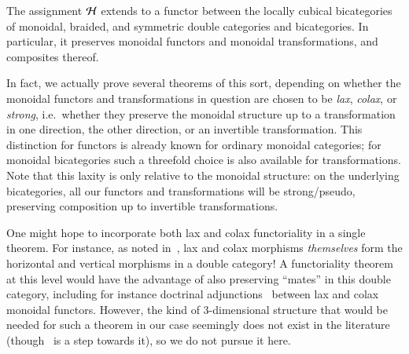\begin{thm}\label{thm:functor-intro}
  The assignment $\mathcal{H}$ extends to a functor between the locally cubical bicategories of monoidal, braided, and symmetric double categories and bicategories.
  In particular, it preserves monoidal functors and monoidal transformations, and composites thereof.
\end{thm}

In fact, we actually prove several theorems of this sort, depending on whether the monoidal functors and transformations in question are chosen to be \emph{lax}, \emph{colax}, or \emph{strong}, i.e.\ whether they preserve the monoidal structure up to a transformation in one direction, the other direction, or an invertible transformation.
This distinction for functors is already known for ordinary monoidal categories; for monoidal bicategories such a threefold choice is also available for transformations.
Note that this laxity is only relative to the monoidal structure: on the underlying bicategories, all our functors and transformations will be strong/pseudo, preserving composition up to invertible transformations.

One might hope to incorporate both lax and colax functoriality in a single theorem.
For instance, as noted in~\cite{gp:double-adjoints,shulman:dblderived}, lax and colax morphisms \emph{themselves} form the horizontal and vertical morphisms in a double category!
A functoriality theorem at this level would have the advantage of also preserving ``mates'' in this double category, including for instance doctrinal adjunctions~\cite{kelly:doc-adjn} between lax and colax monoidal functors.
However, the kind of 3-dimensional structure that would be needed for such a theorem in our case seemingly does not exist in the literature (though~\cite{gp:intercategories-i} is a step towards it), so we do not pursue it here.

